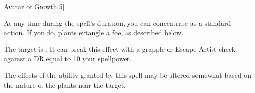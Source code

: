 \begin{spellsection}{Avatar of Growth}[5]
    \begin{spellheader}
    \end{spellheader}
    \begin{spellcontent}
        \begin{spelltargetinginfo}
        \end{spelltargetinginfo}
        \begin{spelleffects}
            \spelleffect At any time during the spell's duration, you can concentrate as a standard action. If you do, plants entangle a foe, as described below.
            \spelldur \durlong
        \end{spelleffects}
    \end{spellcontent}
    \begin{spellsubcontent}
        \begin{spelltargetinginfo}
        \end{spelltargetinginfo}
        \begin{spelleffects}
            \spelleffect The target is \entangled.
            It can break this effect with a grapple or Escape Artist check against a DR equal to 10 \add your spellpower.
            \spelldur \durbrief
        \end{spelleffects}
    \end{spellsubcontent}
    \begin{spellfooter}
        \spellnotes The effects of the ability granted by this spell may be altered somewhat based on the nature of the plants near the target.
        \miscastexplode
    \end{spellfooter}
    \begin{spellaugments}
    \end{spellaugments}
\end{spellsection}

